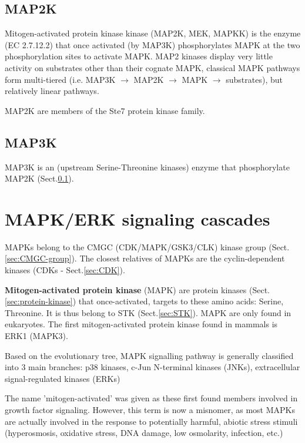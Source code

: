 \subsection{MAP2K}
\label{sec:MAP2K}

Mitogen-activated protein kinase kinase (MAP2K, MEK, MAPKK) is the enzyme (EC
2.7.12.2) that once activated (by MAP3K) phosphorylates MAPK at the two
phosphorylation sites to activate MAPK. MAP2 kinases display very little
activity on substrates other than their cognate MAPK, classical MAPK pathways
form multi-tiered (i.e. MAP3K $\rightarrow$ MAP2K $\rightarrow$ MAPK
$\rightarrow$ substrates), but relatively linear pathways.

MAP2K are members of the Ste7 protein kinase family.

\subsection{MAP3K}
\label{sec:MAP3K}

MAP3K is an (upstream Serine-Threonine kinases) enzyme that phosphorylate MAP2K
(Sect.\ref{sec:MAP2K}).


\section{MAPK/ERK signaling cascades}
\label{sec:MAPK}

MAPKs belong to the CMGC (CDK/MAPK/GSK3/CLK) kinase group
(Sect.\ref{sec:CMGC-group}). The closest relatives of MAPKs are the
cyclin-dependent kinases (CDKs - Sect.\ref{sec:CDK}).

{\bf Mitogen-activated protein kinase }(MAPK) are protein kinases
(Sect.\ref{sec:protein-kinase}) that once-activated, targets to these amino
acids: Serine, Threonine. It is thus belong to STK (Sect.\ref{sec:STK}). MAPK
are only found in eukaryotes. The first mitogen-activated protein kinase found
in mammals is ERK1 (MAPK3).

\begin{mdframed}
Based on the evolutionary tree, MAPK signalling pathway is generally classified
into 3 main branches: p38 kinases, c-Jun N-terminal kinases (JNKs),
extracellular signal-regulated kinases (ERKs)

The name 'mitogen-activated' was given as these first found members involved in
growth factor signaling. However, this term is now a misnomer, as most
MAPKs are actually involved in the response to potentially harmful, abiotic stress
stimuli (hyperosmosis, oxidative stress, DNA damage, low osmolarity, infection,
etc.)
\end{mdframed}

